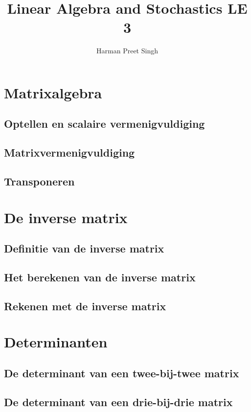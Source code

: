 \documentclass[a4paper, 12pt]{article}
\title{Linear Algebra and Stochastics \textemdash{} LE 3}
\author{Harman Preet Singh}
\begin{document}

\maketitle
\tableofcontents

\section{Matrixalgebra}
\subsection{Optellen en scalaire vermenigvuldiging}
\subsection{Matrixvermenigvuldiging}
\subsection{Transponeren}

\section{De inverse matrix}
\subsection{Definitie van de inverse matrix}
\subsection{Het berekenen van de inverse matrix}
\subsection{Rekenen met de inverse matrix}

\section{Determinanten}
\subsection{De determinant van een twee-bij-twee matrix}
\subsection{De determinant van een drie-bij-drie matrix}
\end{document}
